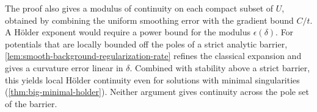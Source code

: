 The proof also gives a modulus of continuity on each compact subset of $U$, obtained by combining the uniform smoothing error with the gradient bound $C/t$. A H\"older exponent would require a power bound for the modulus $\epsilon(\delta)$. For potentials that are locally bounded off the poles of a strict analytic barrier, \cref{lem:smooth-background-regularization-rate} refines the classical expansion and gives a curvature error linear in $\delta$. Combined with stability above a strict barrier, this yields local H\"older continuity even for solutions with minimal singularities (\cref{thm:big-minimal-holder}). Neither argument gives continuity across the pole set of the barrier.
